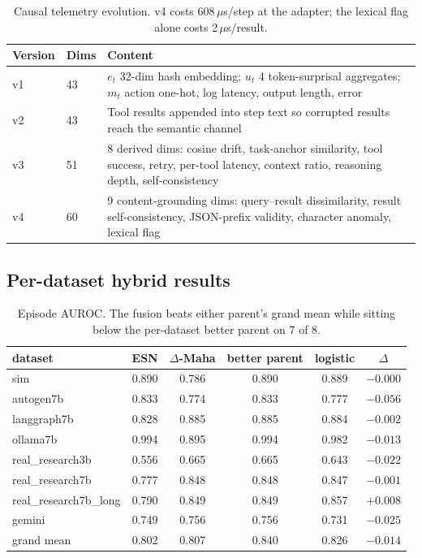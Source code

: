 \documentclass{article}
\begin{document}
\begin{table}[h]
\centering
\small
\begin{tabular}{llp{8.4cm}}
\toprule
Version & Dims & Content \\
\midrule
v1 & 43 & $e_t$ 32-dim hash embedding; $u_t$ 4 token-surprisal aggregates;
$m_t$ action one-hot, log latency, output length, error \\
v2 & 43 & Tool results appended into step text so corrupted results reach the
semantic channel \\
v3 & 51 & 8 derived dims: cosine drift, task-anchor similarity, tool success,
retry, per-tool latency, context ratio, reasoning depth, self-consistency \\
v4 & 60 & 9 content-grounding dims: query--result dissimilarity, result
self-consistency, JSON-prefix validity, character anomaly, lexical flag \\
\bottomrule
\end{tabular}
\caption{Causal telemetry evolution. v4 costs 608\,$\mu$s/step at the adapter;
the lexical flag alone costs 2\,$\mu$s/result.}
\end{table}

\subsection{Per-dataset hybrid results}

\begin{table}[h]
\centering
\small
\begin{tabular}{lccccc}
\toprule
dataset & ESN & $\Delta$-Maha & better parent & logistic & $\Delta$ \\
\midrule
sim                  & 0.890 & 0.786 & 0.890 & 0.889 & $-0.000$ \\
autogen7b            & 0.833 & 0.774 & 0.833 & 0.777 & $-0.056$ \\
langgraph7b          & 0.828 & 0.885 & 0.885 & 0.884 & $-0.002$ \\
ollama7b             & 0.994 & 0.895 & 0.994 & 0.982 & $-0.013$ \\
real\_research3b     & 0.556 & 0.665 & 0.665 & 0.643 & $-0.022$ \\
real\_research7b     & 0.777 & 0.848 & 0.848 & 0.847 & $-0.001$ \\
real\_research7b\_long & 0.790 & 0.849 & 0.849 & 0.857 & $+0.008$ \\
gemini               & 0.749 & 0.756 & 0.756 & 0.731 & $-0.025$ \\
\midrule
grand mean           & 0.802 & 0.807 & 0.840 & 0.826 & $-0.014$ \\
\bottomrule
\end{tabular}
\caption{Episode AUROC. The fusion beats either parent's grand mean while
sitting below the per-dataset better parent on 7 of 8.}
\end{table}
\end{document}
